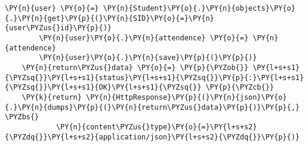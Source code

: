 \begin{Verbatim}[commandchars=\\\{\}]
        \PY{n}{user} \PY{o}{=} \PY{n}{Student}\PY{o}{.}\PY{n}{objects}\PY{o}{.}\PY{n}{get}\PY{p}{(}\PY{n}{SID}\PY{o}{=}\PY{n}{user\PYZus{}id}\PY{p}{)}
        \PY{n}{user}\PY{o}{.}\PY{n}{attendence} \PY{o}{=} \PY{n}{attendence}
        \PY{n}{user}\PY{o}{.}\PY{n}{save}\PY{p}{(}\PY{p}{)}
    \PY{n}{return\PYZus{}data} \PY{o}{=} \PY{p}{\PYZob{}} \PY{l+s+s1}{\PYZsq{}}\PY{l+s+s1}{status}\PY{l+s+s1}{\PYZsq{}}\PY{p}{:}\PY{l+s+s1}{\PYZsq{}}\PY{l+s+s1}{OK}\PY{l+s+s1}{\PYZsq{}} \PY{p}{\PYZcb{}}
    \PY{k}{return} \PY{n}{HttpResponse}\PY{p}{(}\PY{n}{json}\PY{o}{.}\PY{n}{dumps}\PY{p}{(}\PY{n}{return\PYZus{}data}\PY{p}{)}\PY{p}{,} \PYZbs{}
            \PY{n}{content\PYZus{}type}\PY{o}{=}\PY{l+s+s2}{\PYZdq{}}\PY{l+s+s2}{application/json}\PY{l+s+s2}{\PYZdq{}}\PY{p}{)}
\end{Verbatim}
